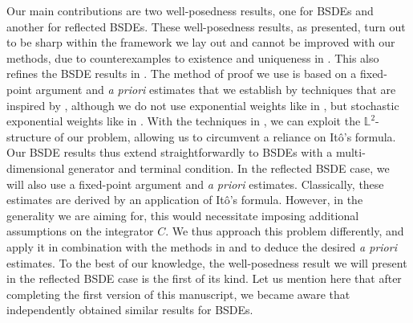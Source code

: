 \documentclass[10pt]{article} %
\def \L{\mathbb{L}}
\newcommand{\1}{\mathbf{1}}
\begin{document}
\medskip
Our main contributions are two well-posedness results, one for BSDEs and another for reflected BSDEs. These well-posedness results, as presented, turn out to be sharp within the framework we lay out and cannot be improved with our methods, due to counterexamples to existence and uniqueness in \citeauthor*{confortola2014backward} \cite{confortola2014backward}. This also refines the BSDE results in \cite{papapantoleon2018existence}. The method of proof we use is based on a fixed-point argument and \emph{a priori} estimates that we establish by techniques that are inspired by \cite{elkaroui1997general}, although we do not use exponential weights like in \cite{papapantoleon2018existence}, but stochastic exponential weights like in \cite{bandini2015existence,cohen2012existence}. With the techniques in \cite{elkaroui1997general}, we can exploit the $\L^2$-structure of our problem, allowing us to circumvent a reliance on It\^o's formula. Our BSDE results thus extend straightforwardly to BSDEs with a multi-dimensional generator and terminal condition. In the reflected BSDE case, we will also use a fixed-point argument and \emph{a priori} estimates. Classically, these estimates are derived by an application of It\^o’s formula. However, in the generality we are aiming for, this would necessitate imposing additional assumptions on the integrator $C$. We thus approach this problem differently, and apply it in combination with the methods in \cite{elkaroui1997general} and \cite{grigorova2020optimal} to deduce the desired \emph{a priori} estimates. To the best of our knowledge, the well-posedness result we will present in the reflected BSDE case is the first of its kind. Let us mention here that after completing the first version of this manuscript, we became aware that \citeauthor*{papapantoleon2024existence} \cite{papapantoleon2024existence} independently obtained similar results for BSDEs.
\end{document}
